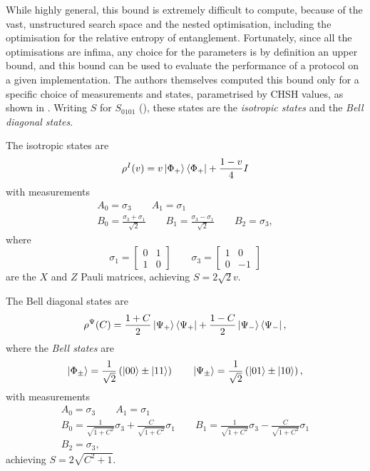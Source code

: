 \documentclass[10pt, a4paper]{article}
\numberwithin{equation}{section} %
\theoremstyle{definition}
\theoremstyle{plain}
\newcommand{\?}{\mathrel{?}} %
\begin{document}
  While highly general, this bound is extremely difficult to compute, because of the vast, unstructured search space and the nested optimisation, including the optimisation for the relative entropy of entanglement. Fortunately, since all the optimisations are infima, any choice for the parameters is by definition an upper bound, and this bound can be used to evaluate the performance of a protocol on a given implementation. The authors themselves computed this bound only for a specific choice of measurements and states, parametrised by CHSH values, as shown in . Writing \(S\) for \(S_{0101}\) (), these states are the \emph{isotropic states} and the \emph{Bell diagonal states}.

  The isotropic states are
    \begin{equation}
      \rho^{I}(v) = v\ket{\Phi_+}\bra{\Phi_+} + \frac{1-v}{4}I
    \end{equation}
    with measurements
    \begin{gather*}
      A_0 = \sigma_3 \qquad A_1 = \sigma_1 \\
      B_0 = \frac{\sigma_3 + \sigma_1}{\sqrt{2}} \qquad B_1 = \frac{\sigma_3 - \sigma_1}{\sqrt{2}} \qquad B_2 = \sigma_3,
    \end{gather*}
    where
    \[ \sigma_1 = \begin{bmatrix} 0 & 1 \\ 1 &  0 \end{bmatrix} \qquad \sigma_3 = \begin{bmatrix} 1 & 0 \\ 0 & -1 \end{bmatrix} \]
    are the \(X\) and \(Z\) Pauli matrices, achieving \(S = 2\sqrt{2}v\).

    The Bell diagonal states are
    \begin{equation}
      \rho^{\Psi}(C) = \frac{1+C}{2}\ket{\Psi_+}\bra{\Psi_+} + \frac{1-C}{2}\ket{\Psi_-}\bra{\Psi_-},
    \end{equation}
    where the \emph{Bell states} are
    \begin{equation}
      \ket{\Phi_{\pm}} = \frac{1}{\sqrt{2}}\left( \ket{00} \pm \ket{11} \right) \qquad \ket{\Psi_{\pm}} = \frac{1}{\sqrt{2}}\left( \ket{01} \pm \ket{10} \right),
    \end{equation}
    with measurements
    \begin{gather*}
      A_0 = \sigma_3 \qquad A_1 = \sigma_1 \\
    B_0 = \frac{1}{\sqrt{1+C^2}}\sigma_3 + \frac{C}{\sqrt{1+C^2}}\sigma_1 \qquad B_1 = \frac{1}{\sqrt{1+C^2}}\sigma_3 - \frac{C}{\sqrt{1+C^2}}\sigma_1 \\
    B_2 = \sigma_3,
    \end{gather*}
    achieving \(S = 2\sqrt{C^2+1}\).
\end{document}
